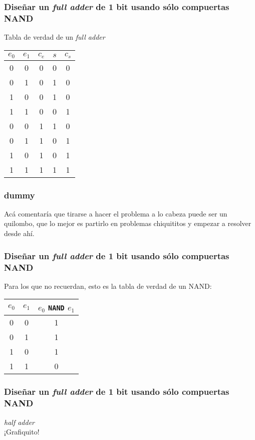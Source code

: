 \documentclass[hyperref={pdfpagelabels=false}]{beamer}
\begin{document}
\begin{frame}
\frametitle{Diseñar un \textit{full adder} de 1 bit usando sólo compuertas
NAND}
Tabla de verdad de un \textit{full adder}
\begin{center}\begin{tabular}{| c | c | c || c | c |}
  \hline
  $e_0$ & $e_1$ & $c_e$ & $s$ & $c_s$ \\ \hline
    0   &   0   &   0   &  0  &   0   \\
    0   &   1   &   0   &  1  &   0   \\
    1   &   0   &   0   &  1  &   0   \\
    1   &   1   &   0   &  0  &   1   \\
    0   &   0   &   1   &  1  &   0   \\
    0   &   1   &   1   &  0  &   1   \\
    1   &   0   &   1   &  0  &   1   \\
    1   &   1   &   1   &  1  &   1   \\
  \hline
\end{tabular}\end{center}
\end{frame}


\begin{frame}
\frametitle{dummy}
Acá comentaría que tirarse a hacer el problema a lo cabeza puede ser un
quilombo, que lo mejor es partirlo en problemas chiquititos y empezar a
resolver desde ahí.
\end{frame}


\begin{frame}
\frametitle{Diseñar un \textit{full adder} de 1 bit usando sólo compuertas
NAND}
Para los que no recuerdan, esto es la tabla de verdad de un NAND:
\begin{center}\begin{tabular}{| c | c || c |}
  \hline
  $e_0$ & $e_1$ & $e_0$ \texttt{NAND} $e_1$ \\ \hline
    0   &   0   &             1             \\
    0   &   1   &             1             \\
    1   &   0   &             1             \\
    1   &   1   &             0             \\
  \hline
\end{tabular}\end{center}
\end{frame}


\begin{frame}
\frametitle{Diseñar un \textit{full adder} de 1 bit usando sólo compuertas
NAND}
\textit{half adder}
\\ ¡Grafiquito!
\end{frame}
\end{document}
